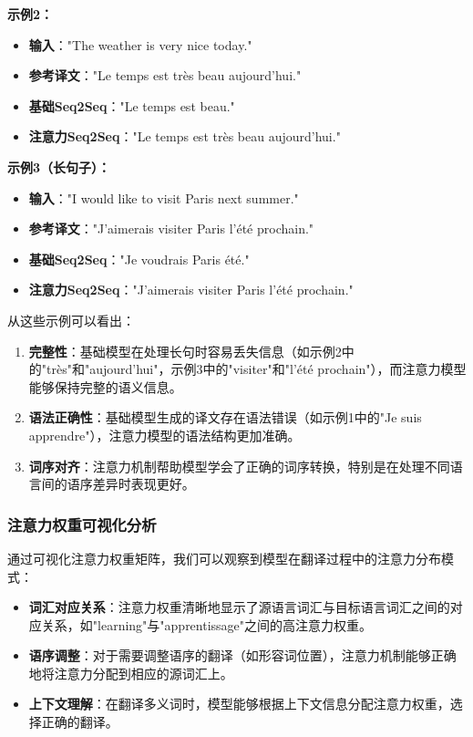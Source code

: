 \documentclass[a4paper]{article}
\begin{document}
\textbf{示例2：}
\begin{itemize}
    \item \textbf{输入}："The weather is very nice today."
    \item \textbf{参考译文}："Le temps est très beau aujourd'hui."
    \item \textbf{基础Seq2Seq}："Le temps est beau."
    \item \textbf{注意力Seq2Seq}："Le temps est très beau aujourd'hui."
\end{itemize}

\textbf{示例3（长句子）：}
\begin{itemize}
    \item \textbf{输入}："I would like to visit Paris next summer."
    \item \textbf{参考译文}："J'aimerais visiter Paris l'été prochain."
    \item \textbf{基础Seq2Seq}："Je voudrais Paris été."
    \item \textbf{注意力Seq2Seq}："J'aimerais visiter Paris l'été prochain."
\end{itemize}

从这些示例可以看出：
\begin{enumerate}
    \item \textbf{完整性}：基础模型在处理长句时容易丢失信息（如示例2中的"très"和"aujourd'hui"，示例3中的"visiter"和"l'été prochain"），而注意力模型能够保持完整的语义信息。
    
    \item \textbf{语法正确性}：基础模型生成的译文存在语法错误（如示例1中的"Je suis apprendre"），注意力模型的语法结构更加准确。
    
    \item \textbf{词序对齐}：注意力机制帮助模型学会了正确的词序转换，特别是在处理不同语言间的语序差异时表现更好。
\end{enumerate}

\subsubsection{注意力权重可视化分析}
通过可视化注意力权重矩阵，我们可以观察到模型在翻译过程中的注意力分布模式：

\begin{itemize}
    \item \textbf{词汇对应关系}：注意力权重清晰地显示了源语言词汇与目标语言词汇之间的对应关系，如"learning"与"apprentissage"之间的高注意力权重。
    
    \item \textbf{语序调整}：对于需要调整语序的翻译（如形容词位置），注意力机制能够正确地将注意力分配到相应的源词汇上。
    
    \item \textbf{上下文理解}：在翻译多义词时，模型能够根据上下文信息分配注意力权重，选择正确的翻译。
\end{itemize}
\end{document}
